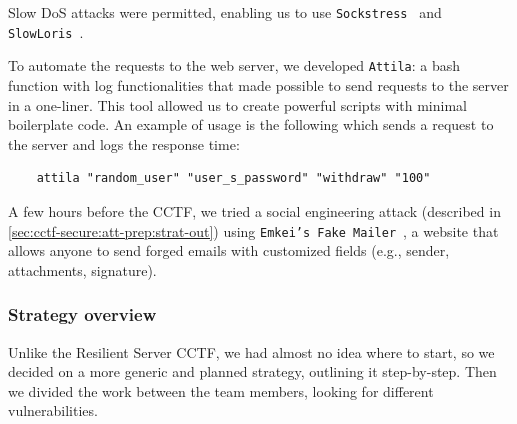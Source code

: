 Slow DoS attacks were permitted, enabling us to use \texttt{Sockstress}~\cite{github:sockstress} and \texttt{SlowLoris}~\cite{github:slowloris}.

To automate the requests to the web server, we developed \texttt{Attila}: a bash function with log functionalities that made possible to send requests to the server in a one-liner. This tool allowed us to create powerful scripts with minimal boilerplate code. An example of usage is the following which sends a request to the server and logs the response time:

\begin{verbatim}
    attila "random_user" "user_s_password" "withdraw" "100"
\end{verbatim} 

A few hours before the CCTF, we tried a social engineering attack (described in \autoref{sec:cctf-secure:att-prep:strat-out}) using \texttt{Emkei's Fake Mailer}~\cite{emkei}, a website that allows anyone to send forged emails with customized fields (e.g., sender, attachments, signature).

\subsubsection{Strategy overview}
\label{sec:cctf-secure:att-prep:strat-out}

Unlike the Resilient Server CCTF, we had almost no idea where to start, so we decided on a more generic and planned strategy, outlining it step-by-step. Then we divided the work between the team members, looking for different vulnerabilities.

